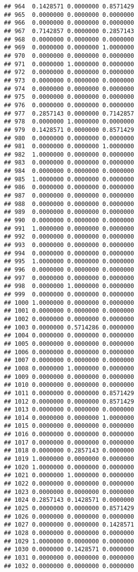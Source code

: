 \documentclass[
]{article}
\begin{document}
\begin{verbatim}
## 964  0.1428571 0.0000000 0.8571429
## 965  0.0000000 0.0000000 0.0000000
## 966  0.0000000 0.0000000 0.0000000
## 967  0.7142857 0.0000000 0.2857143
## 968  0.0000000 0.0000000 0.0000000
## 969  0.0000000 0.0000000 1.0000000
## 970  0.0000000 0.0000000 0.0000000
## 971  0.0000000 1.0000000 0.0000000
## 972  0.0000000 0.0000000 0.0000000
## 973  0.0000000 0.0000000 0.0000000
## 974  0.0000000 0.0000000 0.0000000
## 975  0.0000000 0.0000000 0.0000000
## 976  0.0000000 0.0000000 0.0000000
## 977  0.2857143 0.0000000 0.7142857
## 978  0.0000000 1.0000000 0.0000000
## 979  0.1428571 0.0000000 0.8571429
## 980  0.0000000 0.0000000 0.0000000
## 981  0.0000000 0.0000000 1.0000000
## 982  1.0000000 0.0000000 0.0000000
## 983  0.0000000 0.0000000 0.0000000
## 984  0.0000000 0.0000000 0.0000000
## 985  1.0000000 0.0000000 0.0000000
## 986  0.0000000 0.0000000 0.0000000
## 987  0.0000000 0.0000000 0.0000000
## 988  0.0000000 0.0000000 0.0000000
## 989  0.0000000 0.0000000 0.0000000
## 990  0.0000000 0.0000000 0.0000000
## 991  1.0000000 0.0000000 0.0000000
## 992  0.0000000 0.0000000 0.0000000
## 993  0.0000000 0.0000000 0.0000000
## 994  0.0000000 0.0000000 0.0000000
## 995  1.0000000 0.0000000 0.0000000
## 996  0.0000000 0.0000000 0.0000000
## 997  0.0000000 0.0000000 0.0000000
## 998  0.0000000 1.0000000 0.0000000
## 999  0.0000000 0.0000000 0.0000000
## 1000 1.0000000 0.0000000 0.0000000
## 1001 0.0000000 0.0000000 0.0000000
## 1002 0.0000000 0.0000000 0.0000000
## 1003 0.0000000 0.5714286 0.0000000
## 1004 0.0000000 0.0000000 0.0000000
## 1005 0.0000000 0.0000000 0.0000000
## 1006 0.0000000 0.0000000 0.0000000
## 1007 0.0000000 0.0000000 0.0000000
## 1008 0.0000000 1.0000000 0.0000000
## 1009 0.0000000 0.0000000 0.0000000
## 1010 0.0000000 0.0000000 0.0000000
## 1011 0.0000000 0.0000000 0.8571429
## 1012 0.0000000 0.0000000 0.8571429
## 1013 0.0000000 0.0000000 0.0000000
## 1014 0.0000000 0.0000000 1.0000000
## 1015 0.0000000 0.0000000 0.0000000
## 1016 0.0000000 0.0000000 0.0000000
## 1017 0.0000000 0.0000000 0.0000000
## 1018 0.0000000 0.2857143 0.0000000
## 1019 1.0000000 0.0000000 0.0000000
## 1020 1.0000000 0.0000000 0.0000000
## 1021 0.0000000 1.0000000 0.0000000
## 1022 0.0000000 0.0000000 0.0000000
## 1023 0.0000000 0.0000000 0.0000000
## 1024 0.2857143 0.1428571 0.0000000
## 1025 0.0000000 0.0000000 0.8571429
## 1026 0.0000000 0.0000000 0.0000000
## 1027 0.0000000 0.0000000 0.1428571
## 1028 0.0000000 0.0000000 0.0000000
## 1029 1.0000000 0.0000000 0.0000000
## 1030 0.0000000 0.1428571 0.0000000
## 1031 0.0000000 0.0000000 0.0000000
## 1032 0.0000000 0.0000000 0.0000000

\end{verbatim}
\end{document}
